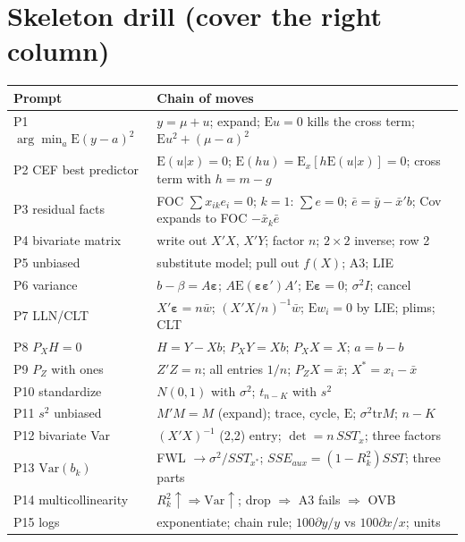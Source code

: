\documentclass[11pt]{article}
\newcommand{\E}{\mathrm{E}}
\newcommand{\Var}{\mathrm{Var}}
\newcommand{\tr}{\mathrm{tr}}
\newcommand{\veps}{\bm{\varepsilon}}
\begin{document}
\section{Skeleton drill (cover the right column)}
\renewcommand{\arraystretch}{1.35}
\begin{tabular}{@{}p{}p{}@{}}\toprule
\textbf{Prompt} & \textbf{Chain of moves}\\\midrule
P1 $\arg\min_a\E(y-a)^2$ & $y=\mu+u$; expand; $\E u=0$ kills the cross term; $\E u^2+(\mu-a)^2$\\
P2 CEF best predictor & $\E(u|x)=0$; $\E(hu)=\E_x[h\E(u|x)]=0$; cross term with $h=m-g$\\
P3 residual facts & FOC $\sum x_{ik}e_i=0$; $k{=}1$: $\sum e=0$; $\bar e=\bar y-\bar x'b$; Cov expands to FOC $-\bar x_k\bar e$\\
P4 bivariate matrix & write out $X'X$, $X'Y$; factor $n$; $2\times2$ inverse; row 2\\
P5 unbiased & substitute model; pull out $f(X)$; A3; LIE\\
P6 variance & $b-\beta=A\veps$; $A\E(\veps\veps')A'$; $\E\veps=0$; $\sigma^2I$; cancel\\
P7 LLN/CLT & $X'\veps=n\bar w$; $(X'X/n)^{-1}\bar w$; $\E w_i=0$ by LIE; plims; CLT\\
P8 $P_XH=0$ & $H=Y-Xb$; $P_XY=Xb$; $P_XX=X$; $a=b-b$\\
P9 $P_Z$ with ones & $Z'Z=n$; all entries $1/n$; $P_ZX=\bar x$; $X^*=x_i-\bar x$\\
P10 standardize & $N(0,1)$ with $\sigma^2$; $t_{n-K}$ with $s^2$\\
P11 $s^2$ unbiased & $M'M=M$ (expand); trace, cycle, $\E$; $\sigma^2\tr M$; $n-K$\\
P12 bivariate Var & $(X'X)^{-1}$ (2,2) entry; $\det=n\,SST_x$; three factors\\
P13 $\Var(b_k)$ & FWL $\to\sigma^2/SST_{x^*}$; $SSE_{aux}=(1-R^2_k)SST$; three parts\\
P14 multicollinearity & $R_k^2\uparrow\Rightarrow\Var\uparrow$; drop $\Rightarrow$ A3 fails $\Rightarrow$ OVB\\
P15 logs & exponentiate; chain rule; $100\partial y/y$ vs $100\partial x/x$; units\\\bottomrule
\end{tabular}

\end{document}

